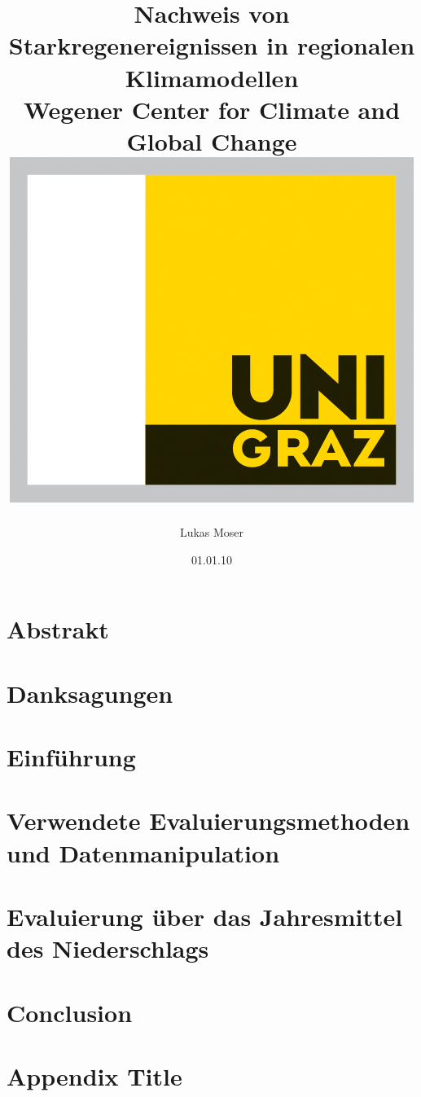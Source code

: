 \documentclass[12pt,twoside]{report}
\title{
	{Nachweis von Starkregenereignissen in regionalen Klimamodellen}\\
	{\large Wegener Center for Climate and Global Change}\\
	{\includegraphics{university.jpg}}
}
\author{Lukas Moser}
\date{01.01.10}
\begin{document}
	\maketitle

	
	\chapter*{Abstrakt}
	
	
	\chapter*{Danksagungen}
	
	\tableofcontents
	
	\chapter{Einführung}
	\label{chap:intro}
	
	
	\chapter{Verwendete Evaluierungsmethoden und Datenmanipulation}
	\label{chap:methods}
	
	
	\chapter{Evaluierung über das Jahresmittel des Niederschlags}
	\label{chap:mean}
	
	
	
	\chapter{Conclusion}
	\label{chap:conclusion}
	
	
	\appendix
	\chapter{Appendix Title}
	
	\printbibliography
\end{document}
